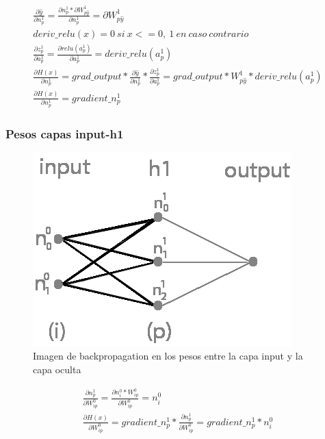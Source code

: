 \begin{gather}
	\frac{\partial \hat{y}}{\partial n^1_p} = \frac{\partial n^1_p * \partial W^1 _{p\hat{y}} }{\partial n^1_p } = \partial W^1_{p\hat{y}} \\
	deriv\_relu(x) = 0\ si\ x <= 0,\ 1\ en\ caso\ contrario \\
	\frac{\partial z^1_p }{\partial a^1_p } = \frac{\partial relu(a^1_p)}{\partial a^1_p } = deriv\_relu(a^1_p) \\
	\frac{\partial H(x) }{\partial n^1_p } = grad\_output* \frac{\partial \hat{y} }{\partial n^1_p } * \frac{\partial z^1_p }{\partial a^1_p } = grad\_output * W^1_{p\hat{y} } * deriv\_relu(a^1_p ) \\
	\frac{\partial H(x) }{\partial n^1_p } = gradient\_n^1_p
\end{gather}

\subsubsection{Pesos capas input-h1}

\begin{figure}[H]
	\centering
	\includegraphics[scale=0.35]{imagenes/nn_1_capa_pesos_input_h1.jpg}  
	\caption{Imagen de backpropagation en los pesos entre la capa input y la capa oculta}
	\label{fig:nn_1_pesos_input_h1}
\end{figure}


\begin{gather}
	\frac{\partial n^1_p }{\partial W^0_{ip} } = \frac{\partial n^0_i * W^0_{ip} }{\partial W^0_{ip} } = n^0_i \\
	\frac{\partial H(x) }{\partial W^0_{ip} } = gradient\_n^1_p * \frac{\partial n^1_p }{\partial W^0_{ip} } = gradient\_n^1_p * n^0_i 
\end{gather}


